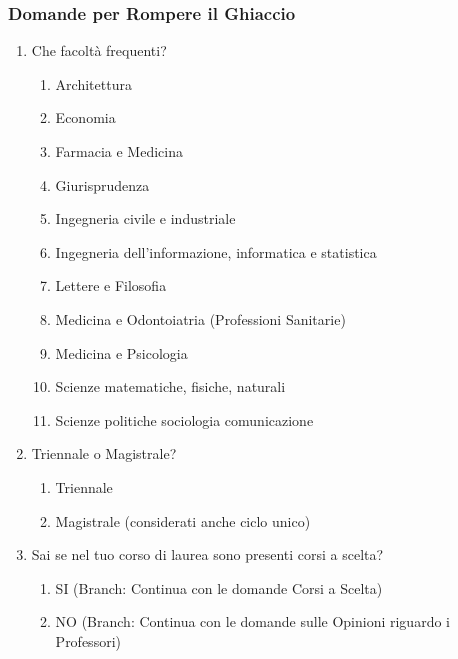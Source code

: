 \subsubsection{Domande per Rompere il Ghiaccio}
\begin{enumerate}
    \item Che facoltà frequenti?
    \begin{enumerate}
        \item Architettura
        \item Economia
        \item Farmacia e Medicina
        \item Giurisprudenza
        \item Ingegneria civile e industriale
        \item Ingegneria dell'informazione, informatica e statistica
        \item Lettere e Filosofia
        \item Medicina e Odontoiatria (Professioni Sanitarie)
        \item Medicina e Psicologia
        \item Scienze matematiche, fisiche, naturali
        \item Scienze politiche sociologia comunicazione
    \end{enumerate}
    \item Triennale o Magistrale?
    \begin{enumerate}
        \item Triennale
        \item Magistrale (considerati anche ciclo unico)
    \end{enumerate}
    \item Sai se nel tuo corso di laurea sono presenti corsi a scelta?
    \begin{enumerate}
        \item SI (Branch: Continua con le domande Corsi a Scelta)
        \item NO (Branch: Continua con le domande sulle Opinioni riguardo i Professori)
    \end{enumerate}
\end{enumerate}

